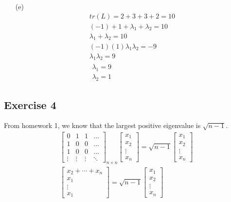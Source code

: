 \documentclass{article}
\begin{document}
\begin{enumerate}
  \item[(e)]
  \begin{gather*}
    tr(L) = 2 + 3 + 3 + 2 = 10 \\
    (-1) + 1 + \lambda_1 + \lambda_2 = 10 \\
    \lambda_1 + \lambda_2 = 10 \\
    (-1)(1)\lambda_1 \lambda_2 = -9 \\
    \lambda_1 \lambda_2 = 9 \\
    \boxed{
      \begin{split}
        \lambda_1 = 9 \\
        \lambda_2 = 1
      \end{split}
    }
  \end{gather*}
\end{enumerate}

\newpage

\subsection*{Exercise 4}

From homework 1, we know that the largest positive eigenvalue is \( \sqrt{n - 1} \).
\begin{gather*}
  \begin{bmatrix}
    0 & 1 & 1 & \dotso \\
    1 & 0 & 0 & \dotso \\
    1 & 0 & 0 & \dotso \\
    \vdots & \vdots & \vdots & \ddots
  \end{bmatrix}_{n \times n}
  \begin{bmatrix}
    x_1 \\ x_2 \\ \vdots \\ x_n
  \end{bmatrix}
  =
  \sqrt{n - 1}
  \begin{bmatrix}
    x_1 \\ x_2 \\ \vdots \\ x_n
  \end{bmatrix} \\
  \begin{bmatrix}
    x_2 + \dotsb + x_n \\ x_1 \\ \vdots \\ x_1
  \end{bmatrix}
  =
  \sqrt{n - 1}
  \begin{bmatrix}
    x_1 \\ x_2 \\ \vdots \\ x_n
  \end{bmatrix}
\end{gather*}
\end{document}
